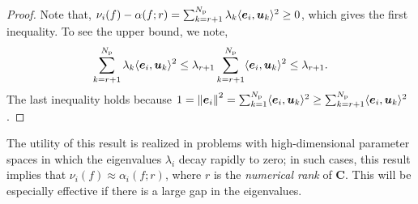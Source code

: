 \documentclass[1pt]{elsarticle}
\renewcommand{\vec}[1]{{\mathchoice
                     {\mbox{\boldmath$\displaystyle{#1}$}}
                     {\mbox{\boldmath$\textstyle{#1}$}}
                     {\mbox{\boldmath$\scriptstyle{#1}$}}
                     {\mbox{\boldmath$\scriptscriptstyle{#1}$}}}}
\newcommand{\norm}[1]{\left\| {#1} \right\|}
\newcommand{\R}{\mathbb{R}}
\newcommand{\ip}[2]{\langle{#1}, {#2}\rangle}
\newcommand{\mat}[1]{\mathbf{{#1}}}
\newcommand{\Np}{{N_\text{p}}}
\begin{document}
\begin{proof} 


Note that, $\nu_i(f) - \alpha(f; r)  = \sum_{k=r+1}^\Np \lambda_k \ip{\vec{e}_i}{\vec{u}_k}^2 \geq 0$,
which gives the first inequality. To see the upper bound, we note,
\[
   \sum_{k=r+1}^\Np \lambda_k \ip{\vec{e}_i}{\vec{u}_k}^2 \leq \lambda_{r+1} \sum_{k=r+1}^\Np \ip{\vec{e}_i}{\vec{u}_k}^2
   \leq \lambda_{r+1}. 
\]
The last inequality holds because 
$1 = \norm{\vec{e}_i}^2 = 
\sum_{k = 1}^\Np \ip{\vec{e}_i}{\vec{u}_k}^2 
\geq \sum_{k=r+1}^\Np \ip{\vec{e}_i}{\vec{u}_k}^2$.
\end{proof} 
The utility of this result is realized in problems with 
high-dimensional parameter spaces in which 
the eigenvalues $\lambda_i$ decay rapidly to zero; in 
such cases, this result implies that  $\nu_i(f) \approx \alpha_i(f; r)$,
where $r$ is the \emph{numerical rank} of $\mat{C}$.  This will be especially
effective if there is a large gap in the eigenvalues.  
\end{document}
